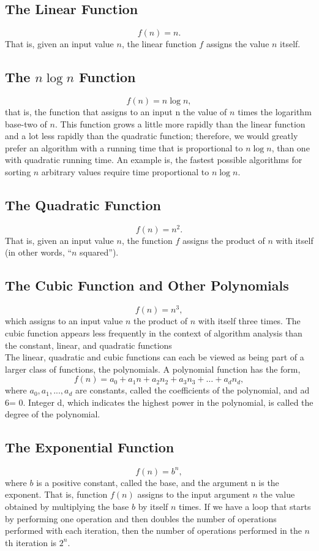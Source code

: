 \documentclass[12pt, a4paper, openany]{book}
\begin{document}
\subsection{The Linear Function}
\[f (n) = n.\]
That is, given an input value \(n\), the linear function \(f\) assigns the value \(n\) itself.

\subsection{The \(n\log n\) Function}
\[f (n) = n\log n,\]
that is, the function that assigns to an input n the value of \(n\) times the logarithm base-two of \(n\).
This function grows a little more rapidly than the linear function and a lot less rapidly than the quadratic
function; therefore, we would greatly prefer an algorithm with a running time that is proportional to \(n\log n\),
than one with quadratic running time. An example is, the fastest possible algorithms
for sorting \(n\) arbitrary values require time proportional to \(n\log n\).

\subsection{The Quadratic Function}
\[f (n) = n^2.\]
That is, given an input value \(n\), the function \(f\) assigns the product of \(n\) with itself
(in other words, “\(n\) squared”).

\subsection{The Cubic Function and Other Polynomials}
\[f (n) = n^3,\]
which assigns to an input value \(n\) the product of \(n\) with itself three times.
The cubic function appears less frequently in the context of algorithm analysis
than the constant, linear, and quadratic functions
\\The linear, quadratic and cubic functions can each be viewed as being part of a
larger class of functions, the polynomials. A polynomial function has the form,
\[f (n) = a_0+a_1n+a_2n_2+a_3n_3 +\dots+a_dn_d,\]
where \(a_0, a_1, . . . , a_d\) are constants, called the coefficients of the polynomial, and
ad 6= 0. Integer d, which indicates the highest power in the polynomial, is called
the degree of the polynomial.

\subsection{The Exponential Function}
\[f (n) = b^n,\]
where \(b\) is a positive constant, called the base, and the argument n is the exponent.
That is, function \(f (n)\) assigns to the input argument \(n\) the value obtained by multiplying the base \(b\) by
itself \(n\) times. If we have a loop that starts by performing one operation
and then doubles the number of operations performed with each iteration, then the
number of operations performed in the \(n\)th iteration is \(2^n\).
\end{document}
